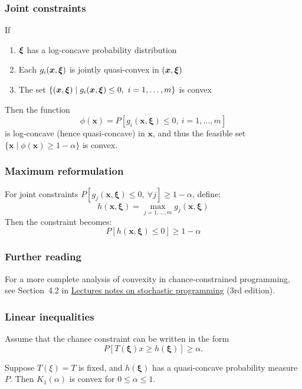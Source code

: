 \documentclass{beamer}
\def\bxi{\boldsymbol\xi}
\begin{document}
\begin{frame}
\frametitle{Joint constraints}

\begin{theorem}
	If
	\begin{enumerate}
		\item ${\boldsymbol{\xi}}$ has a log-concave probability distribution
		\item Each $g_i({\boldsymbol{x}}, {\boldsymbol{\xi}})$ is jointly quasi-convex in $({\boldsymbol{x}}, {\boldsymbol{\xi}})$
		\item The set $\{({\boldsymbol{x}}, {\boldsymbol{\xi}}) \mid g_i({\boldsymbol{x}}, {\boldsymbol{\xi}}) \leq 0, \ i=1,\dots,m\}$ is convex
	\end{enumerate}
	Then the function
	\[
	\phi(\mathbf{x}) = P\left[ g_i(\mathbf{x}, \boldsymbol{\xi}) \leq 0, \ i=1,\dots,m \right]
	\]
	is log-concave (hence quasi-concave) in $\mathbf{x}$, and thus the feasible set $\{\mathbf{x} \mid \phi(\mathbf{x}) \geq 1-\alpha\}$ is convex.
\end{theorem}

\end{frame}

\begin{frame}
\frametitle{Maximum reformulation}

For joint constraints $P[g_j(\mathbf{x}, \boldsymbol{\xi}) \leq 0,\ \forall j] \geq 1-\alpha$, define:
\[
h(\mathbf{x}, \boldsymbol{\xi}) = \max_{j=1,\dots,m} g_j(\mathbf{x}, \boldsymbol{\xi})
\]
Then the constraint becomes:
\[
P[ h(\mathbf{x}, \boldsymbol{\xi}) \leq 0 ] \geq 1-\alpha
\]

\end{frame}

\begin{frame}
\frametitle{Further reading}

For a more complete analysis of convexity in chance-constrained programming, see Section~4.2 in \href{https://epubs.siam.org/doi/book/10.1137/1.9781611976595}{Lectures notes on stochastic programming} (3rd edition).

\end{frame}

\begin{frame}
	\frametitle{Linear inequalities}
	
Assume that the chance constraint can be written in the form
	$$
	P[T(\bxi)x \geq h(\bxi)] \geq \alpha.
	$$
	
	\begin{theorem}
		Suppose $T(\xi) = T$ is fixed, and $h(\bxi)$ has a quasi-concave
		probability measure $P$. Then $K_1(\alpha)$ is convex for $0 \leq \alpha \leq 1$.
	\end{theorem}
	
\end{frame}
\end{document}
